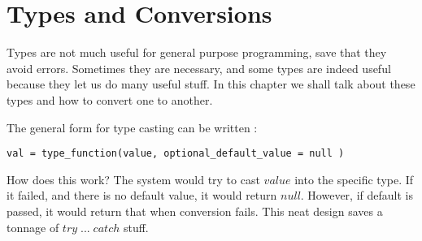 \chapter{Types and Conversions}\label{type-conversions}

{\LARGE T}ypes are not much useful for general purpose programming, save that they avoid errors.
Sometimes they are necessary, and some types are indeed useful because they let us do 
many useful stuff. In this chapter we shall talk about these types and how to convert
one to another.

The general form for type casting can be written :
\begin{lstlisting}[style=JexlStyle]
val = type_function(value, optional_default_value = null )
\end{lstlisting}

How does this work? The system would try to cast $value$
into the specific type. If it failed, and there is no default value, 
it would return $null$. However, if default is passed, it would return 
that when conversion fails.
This neat design saves a tonnage of $try \; ... \; catch$ stuff. 

